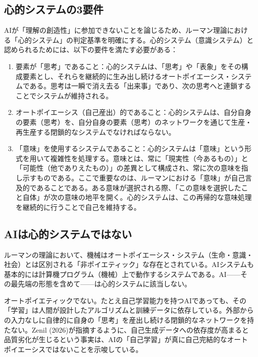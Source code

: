 \documentclass{keikaku}
\begin{document}
\subsection{心的システムの3要件}

AIが「理解の創造性」に参加できないことを論じるため、ルーマン理論における「心的システム」の判定基準を明確にする。心的システム（意識システム）と認められるためには、以下の要件を満たす必要がある\cite{luhmann1984}\cite{luhmann1997}：

\begin{enumerate}
\item 要素が「思考」であること：心的システムは、「思考」や「表象」をその構成要素とし、それらを継続的に生み出し続けるオートポイエーシス・システムである。思考は一瞬で消え去る「出来事」であり、次の思考へと連鎖することでシステムが維持される。

\item オートポイエーシス（自己産出）的であること：心的システムは、自分自身の要素（思考）を、自分自身の要素（思考）のネットワークを通じて生産・再生産する閉鎖的なシステムでなければならない。

\item 「意味」を使用するシステムであること：心的システムは「意味」という形式を用いて複雑性を処理する。意味とは、常に「現実性（今あるもの）」と「可能性（他でありえたもの）」の差異として構成され、常に次の意味を指し示すものである。ここで重要なのは、ルーマンにおける「意味」が自己言及的であることである。ある意味が選択される際、「この意味を選択したこと自体」が次の意味の地平を開く。心的システムは、この再帰的な意味処理を継続的に行うことで自己を維持する。
\end{enumerate}

\subsection{AIは心的システムではない}

ルーマンの理論において、機械はオートポイエーシス・システム（生命・意識・社会）とは区別される「非ポイエティック」な存在とされている\cite{luhmann1984}。AIシステムも基本的には計算機プログラム（機械）上で動作するシステムである。AI——その最先端の形態を含めて——は心的システムに該当しない。

オートポイエティックでない。たとえ自己学習能力を持つAIであっても、その「学習」は人間が設計したアルゴリズムと訓練データに依存している。外部からの入力なしに自律的に自身の「思考」を産出し続ける閉鎖的なネットワークを持たない。Zenil (2026)が指摘するように、自己生成データへの依存度が高まると品質劣化が生じるという事実\cite{zenil2026}は、AIの「自己学習」が真に自己完結的なオートポイエーシスではないことを示唆している。
\end{document}
